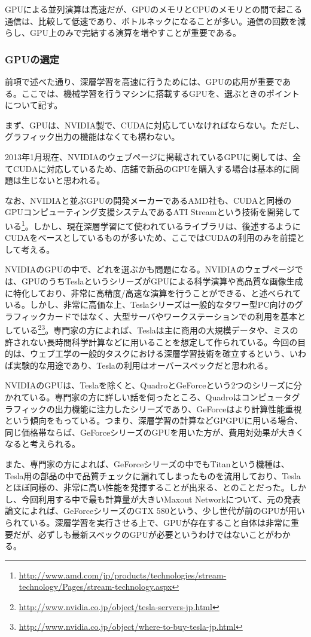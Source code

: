 GPUによる並列演算は高速だが、GPUのメモリとCPUのメモリとの間で起こる通信は、比較して低速であり、ボトルネックになることが多い。通信の回数を減らし、GPU上のみで完結する演算を増やすことが重要である\cite{bengio2012practical}。

\subsubsection{GPUの選定}
前項で述べた通り、深層学習を高速に行うためには、GPUの応用が重要である。ここでは、機械学習を行うマシンに搭載するGPUを、選ぶときのポイントについて記す。\par
まず、GPUは、NVIDIA製で、CUDAに対応していなければならない。ただし、グラフィック出力の機能はなくても構わない。\par2013年1月現在、NVIDIAのウェブページに掲載されているGPUに関しては、全てCUDAに対応しているため、店舗で新品のGPUを購入する場合は基本的に問題は生じないと思われる。\par
なお、NVIDIAと並ぶGPUの開発メーカーであるAMD社も、CUDAと同様のGPUコンピューティング支援システムであるATI Streamという技術を開発している\footnote{\url{http://www.amd.com/jp/products/technologies/stream-technology/Pages/stream-technology.aspx}}。しかし、現在深層学習にて使われているライブラリは、後述するようにCUDAをベースとしているものが多いため、ここではCUDAの利用のみを前提として考える。\par
NVIDIAのGPUの中で、どれを選ぶかも問題になる。NVIDIAのウェブページでは、GPUのうちTeslaというシリーズがGPUによる科学演算や高品質な画像生成に特化しており、非常に高精度/高速な演算を行うことができる、と述べられている。しかし、非常に高価な上、Teslaシリーズは一般的なタワー型PC向けのグラフィックカードではなく、大型サーバやワークステーションでの利用を基本としている\footnote{\url{http://www.nvidia.co.jp/object/tesla-servers-jp.html}}\footnote{\url{http://www.nvidia.co.jp/object/where-to-buy-tesla-jp.html}}。専門家の方によれば、Teslaは主に商用の大規模データや、ミスの許されない長時間科学計算などに用いることを想定して作られている。今回の目的は、ウェブ工学の一般的タスクにおける深層学習技術を確立するという、いわば実験的な用途であり、Teslaの利用はオーバースペックだと思われる。\par
NVIDIAのGPUは、Teslaを除くと、QuadroとGeForceという2つのシリーズに分かれている。専門家の方に詳しい話を伺ったところ、Quadroはコンピュータグラフィックの出力機能に注力したシリーズであり、GeForceはより計算性能重視という傾向をもっている。つまり、深層学習の計算などGPGPUに用いる場合、同じ価格帯ならば、GeForceシリーズのGPUを用いた方が、費用対効果が大きくなると考えられる。\par
また、専門家の方によれば、GeForceシリーズの中でもTitanという機種は、Tesla用の部品の中で品質チェックに漏れてしまったものを流用しており、Teslaとほぼ同様の、非常に高い性能を発揮することが出来る、とのことだった。しかし、今回利用する中で最も計算量が大きいMaxout Networkについて、元の発表論文によれば、GeForceシリーズのGTX 580という、少し世代が前のGPUが用いられている。深層学習を実行させる上で、GPUが存在すること自体は非常に重要だが、必ずしも最新スペックのGPUが必要というわけではないことがわかる。


